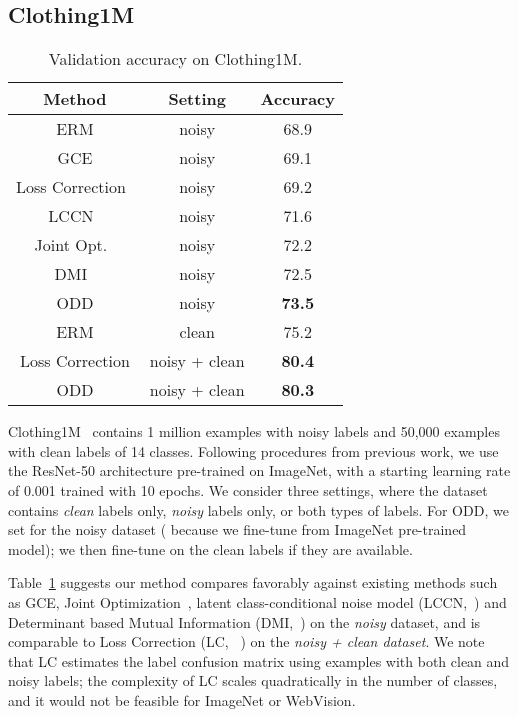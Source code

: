 \documentclass[a4paper,11pt]{article}
\begin{document}
\subsection{Clothing1M}
\label{sec:clothing1m}

\begin{table}
\centering
 \caption{Validation accuracy on Clothing1M.}
    \begin{tabular}{c|c|c}
    \toprule
        Method & Setting & Accuracy \\\midrule
        \textsc{ERM} & noisy & 68.9 \\
        GCE & noisy & 69.1 \\
        Loss Correction~\cite{patrini2017making} & noisy & 69.2 \\
        LCCN~\cite{yao2019safeguarded} & noisy & 71.6 \\
        Joint Opt.~\cite{tanaka2018joint} & noisy & 72.2 \\
        DMI~\cite{xu2019l_dmi} & noisy & 72.5 \\
        \textsc{ODD} & noisy & \textbf{73.5} \\\midrule
        \textsc{ERM} & clean & 75.2 \\
        Loss Correction & noisy + clean & \textbf{80.4} \\
        \textsc{ODD} & noisy + clean & \textbf{80.3} \\
        \bottomrule
    \end{tabular}
    \label{tab:clothing1m}
\end{table}

Clothing1M~\cite{xiao2015learning} contains 1 million examples with noisy labels and 50,000 examples with clean labels 
of 14 classes. Following procedures from previous work, we use the ResNet-50 architecture pre-trained on ImageNet, with a starting learning rate of 0.001 trained with 10 epochs. We consider three settings, where the dataset contains \textit{clean} labels only, \textit{noisy} labels only, or both types of labels. For \textsc{ODD}, we set  for the noisy dataset ( because we fine-tune from ImageNet pre-trained model); we then fine-tune on the clean labels if they are available. 

Table~\ref{tab:clothing1m} suggests our method compares favorably against existing methods such as GCE, Joint Optimization~\cite{tanaka2018joint}, latent class-conditional noise
model (LCCN,~\cite{yao2019safeguarded}) and Determinant based Mutual
Information (DMI,~\cite{xu2019l_dmi}) on the \textit{noisy} dataset, and is comparable to Loss Correction (LC, ~\cite{patrini2017making}) on the \textit{noisy + clean dataset}. We note that LC estimates the label confusion matrix using examples with both clean and noisy labels; the complexity of LC scales quadratically in the number of classes, and it would not be feasible for ImageNet or WebVision.
\end{document}
